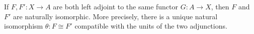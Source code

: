 If $F, F': X \to A$ are both left adjoint to the same functor $G: A \to X$, then $F$ and $F'$ are naturally isomorphic. More precisely, there is a unique natural isomorphism $\theta: F \cong F'$ compatible with the units of the two adjunctions.
